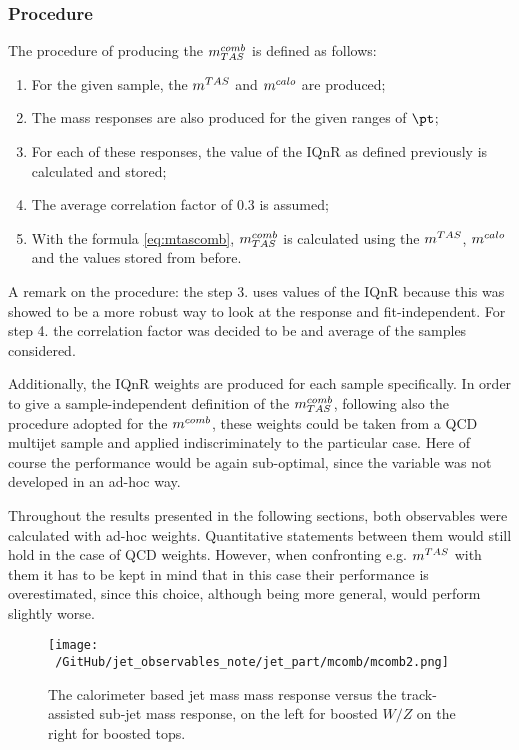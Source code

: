 \subsubsection{Procedure}
The procedure of producing the $m^{comb}_{TAS}$ is defined as follows:
\begin{enumerate}
 \item For the given sample, the $\mtas$ and $\mcal$ are produced;
 \item The mass responses are also produced for the given ranges of $\pt$;
 \item For each of these responses, the value of the IQnR as defined previously is calculated and stored;
 \item The average correlation factor of 0.3 is assumed;
 \item With the formula \ref{eq:mtascomb}, $m^{comb}_{TAS}$ is calculated using the $\mtas$, $\mcal$ and the values stored from before.
\end{enumerate}
A remark on the procedure: the step 3. uses values of the IQnR because this was showed to be a more robust way to look at the response and fit-independent. For step 4. the correlation factor was decided to be and average of the samples considered.

Additionally, the IQnR weights are produced for each sample specifically. In order to give a sample-independent definition of the $m^{comb}_{TAS}$, following also the procedure adopted for the $m^{comb}$, these weights could be taken from a QCD multijet sample and applied indiscriminately to the particular case. Here of course the performance would be again sub-optimal, since the variable was not developed in an ad-hoc way.

Throughout the results presented in the following sections, both observables were calculated with ad-hoc weights. Quantitative statements between them would still hold in the case of QCD weights. However, when confronting e.g. $\mtas$ with them it has to be kept in mind that in this case their performance is overestimated, since this choice, although being more general, would perform slightly worse.

\begin{figure}[!ht]
  \centering
      \texttt{[image: ~/GitHub/jet\_observables\_note/jet\_part/mcomb/mcomb2.png]}
  \caption[$\mcal$ and $\mtas$ correlation plots]{The calorimeter based jet mass mass response versus the track-assisted sub-jet mass response, on the left for boosted $W/Z$ on the right for boosted tops.}
  \label{fig:mcomb2}
\end{figure}

